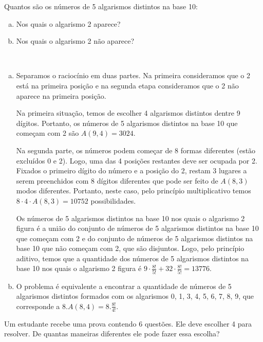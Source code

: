 \documentclass[a4paper, 12pt, addpoints]{exam}
\begin{document}
\begin{questions}
\begin{resp}
\end{resp}

\question Quantos são os números de 5 algarismos distintos na base 10:

\begin{enumerate}[a)]
    \item Nos quais o algarismo 2 aparece?
    \item Nos quais o algarismo 2 não aparece?
\end{enumerate}

\begin{resp}~

  \begin{enumerate}[a)]
    \item Separamos o raciocínio em duas partes. Na primeira consideramos que o 2 está na primeira posição e na segunda etapa consideramos que o 2 não aparece na primeira posição.

    Na primeira situação, temos de escolher 4 algarismos distintos dentre 9 dígitos. Portanto, os números de 5 algarismos distintos na base 10 que começam com 2 são $A(9, 4) = 3024$.
    
    Na segunda parte, os números podem começar de 8 formas diferentes (estão excluídos 0 e 2). Logo, uma das 4 posições restantes deve ser ocupada por 2. Fixados o primeiro dígito do número e a posição do 2, restam 3 lugares a serem preenchidos com 8 dígitos diferentes que pode ser feito de $A(8, 3)$ modos diferentes. Portanto, neste caso, pelo princípio multiplicativo temos $8 \cdot 4 \cdot A(8, 3) = 10752$ possibilidades.
    
    Os números de 5 algarismos distintos na base 10 nos quais o algarismo 2 figura é a união do conjunto de números de 5 algarismos distintos na base 10 que começam com 2 e do conjunto de números de 5 algarismos distintos na base 10 que não começam com 2, que são disjuntos. Logo, pelo princípio aditivo, temos que a quantidade dos números de 5 algarismos distintos na base 10 nos quais o algarismo 2 figura é $9 \cdot \frac{8!}{5!} + 32 \cdot \frac{8!}{5!} = 13776$.

    \item O problema é equivalente a encontrar a quantidade de números de 5 algarismos distintos formados com os algarismos 0, 1, 3, 4, 5, 6, 7, 8, 9, que corresponde a $8.A(8,4) = 8.\frac{8!}{4!}$.
    
  \end{enumerate}
\end{resp}


\question Um estudante recebe uma prova contendo 6 questões. Ele deve escolher
4 para resolver. De quantas maneiras diferentes ele pode fazer essa escolha?


\end{questions}
\end{document}
